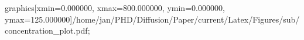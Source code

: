 graphics[xmin=0.000000, xmax=800.000000, ymin=0.000000, ymax=125.000000]{/home/jan/PHD/Diffusion/Paper/current/Latex/Figures/sub/concentration_plot.pdf}; 
